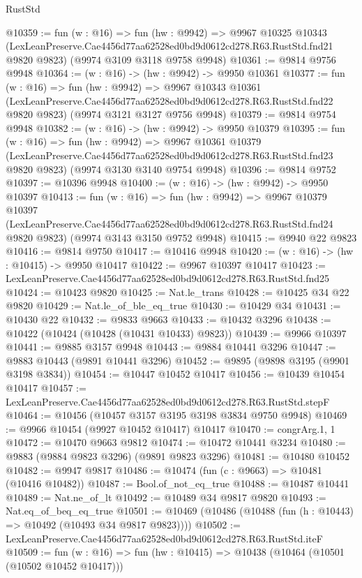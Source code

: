 \begin{lexlean}{RustStd}
\begin{coremodule}
@10359 := fun (w : @16) =>
  fun (hw : @9942) =>
  @9967
    @10325
    @10343
    (LexLeanPreserve.Cae4456d77aa62528ed0bd9d0612cd278.R63.RustStd.fnd21 @9820 @9823)
    (@9974 @3109 @3118 @9758 @9948)
@10361 := @9814 @9756 @9948
@10364 := (w : @16) -> (hw : @9942) -> @9950 @10361
@10377 := fun (w : @16) =>
  fun (hw : @9942) =>
  @9967
    @10343
    @10361
    (LexLeanPreserve.Cae4456d77aa62528ed0bd9d0612cd278.R63.RustStd.fnd22 @9820 @9823)
    (@9974 @3121 @3127 @9756 @9948)
@10379 := @9814 @9754 @9948
@10382 := (w : @16) -> (hw : @9942) -> @9950 @10379
@10395 := fun (w : @16) =>
  fun (hw : @9942) =>
  @9967
    @10361
    @10379
    (LexLeanPreserve.Cae4456d77aa62528ed0bd9d0612cd278.R63.RustStd.fnd23 @9820 @9823)
    (@9974 @3130 @3140 @9754 @9948)
@10396 := @9814 @9752
@10397 := @10396 @9948
@10400 := (w : @16) -> (hw : @9942) -> @9950 @10397
@10413 := fun (w : @16) =>
  fun (hw : @9942) =>
  @9967
    @10379
    @10397
    (LexLeanPreserve.Cae4456d77aa62528ed0bd9d0612cd278.R63.RustStd.fnd24 @9820 @9823)
    (@9974 @3143 @3150 @9752 @9948)
@10415 := @9940 @22 @9823
@10416 := @9814 @9750
@10417 := @10416 @9948
@10420 := (w : @16) -> (hw : @10415) -> @9950 @10417
@10422 := @9967 @10397 @10417
@10423 := LexLeanPreserve.Cae4456d77aa62528ed0bd9d0612cd278.R63.RustStd.fnd25
@10424 := @10423 @9820
@10425 := Nat.le_trans
@10428 := @10425 @34 @22 @9820
@10429 := Nat.le_of_ble_eq_true
@10430 := @10429 @34
@10431 := @10430 @22
@10432 := @9833 @9663
@10433 := @10432 @3296
@10438 := @10422 (@10424 (@10428 (@10431 @10433) @9823))
@10439 := @9966 @10397
@10441 := @9885 @3157 @9948
@10443 := @9884 @10441 @3296
@10447 := @9883 @10443 (@9891 @10441 @3296)
@10452 := @9895 (@9898 @3195 (@9901 @3198 @3834))
@10454 := @10447 @10452 @10417
@10456 := @10439 @10454 @10417
@10457 := LexLeanPreserve.Cae4456d77aa62528ed0bd9d0612cd278.R63.RustStd.stepF
@10464 := @10456 (@10457 @3157 @3195 @3198 @3834 @9750 @9948)
@10469 := @9966 @10454 (@9927 @10452 @10417) @10417
@10470 := congrArg.{1, 1}
@10472 := @10470 @9663 @9812
@10474 := @10472 @10441 @3234
@10480 := @9883 (@9884 @9823 @3296) (@9891 @9823 @3296)
@10481 := @10480 @10452
@10482 := @9947 @9817
@10486 := @10474 (fun (c : @9663) => @10481 (@10416 @10482))
@10487 := Bool.of_not_eq_true
@10488 := @10487 @10441
@10489 := Nat.ne_of_lt
@10492 := @10489 @34 @9817 @9820
@10493 := Nat.eq_of_beq_eq_true
@10501 := @10469 (@10486 (@10488 (fun (h : @10443) => @10492 (@10493 @34 @9817 @9823))))
@10502 := LexLeanPreserve.Cae4456d77aa62528ed0bd9d0612cd278.R63.RustStd.iteF
@10509 := fun (w : @16) => fun (hw : @10415) => @10438 (@10464 (@10501 (@10502 @10452 @10417)))

\end{coremodule}
\end{lexlean}
